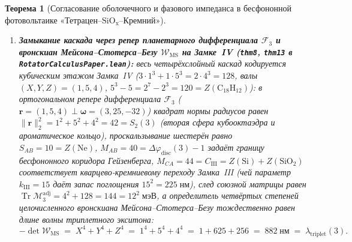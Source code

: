 \documentclass[11pt,a4paper]{article}
\theoremstyle{plain}
\newtheorem{theorem}{Теорема}[section]
\theoremstyle{definition}
\begin{document}
\begin{theorem}[Согласование оболочечного и фазового импеданса в бесфононной фотовольтаике «Тетрацен--$\mathrm{SiO_x}$--Кремний»]
\begin{enumerate}[label=\textbf{(\roman*)},leftmargin=*]
  при расхождении двух триплетов по ортогональным лучам кубооктаэдра с $\Delta\varphi = Q_\square(3) = 128$ их чётный интеграл перекрытия равен нулю ($\mathcal{C}_3(128) = 0$, подавление биэкситонного Оже-самотушения), каждый шаг переноса $\Delta\varphi_{\mathrm{seam}} = 21 < 41 = \Delta\varphi_{\mathrm{disc}}(3)$ излучает $\hat{n}_E(21) = 0$ тепловых фононов, а согласование $n_1/n_2 = \mathrm{mod\_bits}(3)/|{\triangle}(3)| = 9/8$ даёт коэффициент пропускания Френеля
  \[
    T_{\mathrm{Fresnel}}(3) \;=\; 1 - \left(\frac{9-8}{9+8}\right)^2 \;=\; \frac{288}{289} \;\approx\; 99{,}654\%.
  \]
\item \textbf{Замыкание каскада через репер планетарного дифференциала $\mathcal{F}_3$ и вронскиан Мейсона--Стотерса--Безу $\mathcal{W}_{\mathrm{MS}}$ на Замке~IV (\texttt{thm8}, \texttt{thm13} в \texttt{RotatorCalculusPaper.lean}):}
  весь четырёхслойный каскад кодируется кубическим этажом Замка~IV ($3\cdot 1^3 + 1\cdot 5^3 = 2\cdot 4^3 = 128$, валы $(X,Y,Z) = (1,5,4)$, $5^3 - 5 = 2^7 - 2^3 = 120 = Z(\mathrm{C_{18}H_{12}})$): в ортогональном репере дифференциала $\mathcal{F}_3$ ($\mathbf{r} = (1,5,4)\perp\mathbf{\omega} = (3,25,-32)$) квадрат нормы радиусов равен $\|\mathbf{r}\|_2^2 = 1^2 + 5^2 + 4^2 = 42 = S_2(3)$ (вторая сфера кубооктаэдра и ароматическое кольцо), проскальзывание шестерён равно $S_{AB} = 10 = Z(\mathrm{Ne})$, $M_{AB} = 40 = \Delta\varphi_{\mathrm{disc}}(3) - 1$ задаёт границу бесфононного коридора Гейзенберга, $M_{CA} = 44 = C_{\mathrm{III}} = Z(\mathrm{Si}) + Z(\mathrm{SiO_2})$ соответствует кварцево-кремниевому переходу Замка~III (чей параметр $k_{\mathrm{III}} = 15$ даёт запас поглощения $15^2 = 225\;\text{нм}$), след союзной матрицы равен $\operatorname{Tr}\mathcal{M}_3^{\mathrm{adj}} = 4^2 + 128 = 144 = 12^2\;\text{мэВ}$, а определитель четвёртых степеней целочисленного вронскиана Мейсона--Стотерса--Безу тождественно равен длине волны триплетного экситона:
  \begin{equation}
    \label{eq:wms-882}
    -\det\mathcal{W}_{\mathrm{MS}} \;=\; X^4 + Y^4 + Z^4 \;=\; 1^4 + 5^4 + 4^4 \;=\; 1 + 625 + 256 \;=\; 882\;\text{нм} \;=\; \lambda_{\mathrm{triplet}}(3).
  \end{equation}
\end{enumerate}
\end{theorem}
\end{document}
